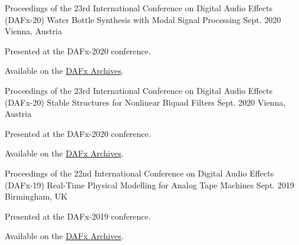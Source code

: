 

\begin{cventries}

  \cventry
    {Proceedings of the 23rd International Conference on Digital Audio Effects (DAFx-20)} %
    {Water Bottle Synthesis with Modal Signal Processing} %
    {Sept. 2020} %
    {Vienna, Austria} %
    {
      \begin{cvitems} %
        \item {Presented at the DAFx-2020 conference.}
        \item {Available on the \href{https://www.dafx.de/paper-archive/2020/proceedings/papers/DAFx2020_paper_24.pdf}{DAFx Archives}.}
      \end{cvitems}
    }

  \cventry
    {Proceedings of the 23rd International Conference on Digital Audio Effects (DAFx-20)} %
    {Stable Structures for Nonlinear Biquad Filters} %
    {Sept. 2020} %
    {Vienna, Austria} %
    {
      \begin{cvitems} %
        \item {Presented at the DAFx-2020 conference.}
        \item {Available on the \href{https://www.dafx.de/paper-archive/2020/proceedings/papers/DAFx2020_paper_3.pdf}{DAFx Archives}.}
      \end{cvitems}
    }

  \cventry
    {Proceedings of the 22nd International Conference on Digital Audio Effects (DAFx-19)} %
    {Real-Time Physical Modelling for Analog Tape Machines} %
    {Sept. 2019} %
    {Birmingham, UK} %
    {
      \begin{cvitems} %
        \item {Presented at the DAFx-2019 conference.}
        \item {Available on the \href{http://www.dafx.de/paper-archive/2019/DAFx2019_paper_3.pdf}{DAFx Archives}.}
      \end{cvitems}
    }


\end{cventries}
